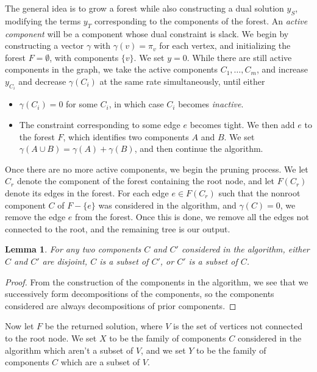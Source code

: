 \documentclass{article}
\theoremstyle{plain}
\newtheorem{lemma}{Lemma}
\theoremstyle{plain}
\begin{document}
The general idea is to grow a forest while also constructing a dual solution $y_S$, modifying the terms $y_T$ corresponding to the components of the forest. An {\it active component} will be a component whose dual constraint is slack. We begin by constructing a vector $\gamma$ with $\gamma(v) = \pi_v$ for each vertex, and initializing the forest $F = \emptyset$, with components $\{ v \}$. We set $y = 0$. While there are still active components in the graph, we take the active components $C_1, \dots, C_m$, and increase $y_{C_i}$ and decrease $\gamma(C_i)$ at the same rate simultaneously, until either
%
\begin{itemize}
    \item $\gamma(C_i) = 0$ for some $C_i$, in which case $C_i$ becomes {\it inactive}.
    \item The constraint corresponding to some edge $e$ becomes tight. We then add $e$ to the forest $F$, which identifies two components $A$ and $B$. We set $\gamma(A \cup B) = \gamma(A) + \gamma(B)$, and then continue the algorithm.
\end{itemize}
%
Once there are no more active components, we begin the pruning process. We let $C_r$ denote the component of the forest containing the root node, and let $F(C_r)$ denote its edges in the forest. For each edge $e \in F(C_r)$ such that the nonroot component $C$ of $F - \{ e \}$ was considered in the algorithm, and $\gamma(C) = 0$, we remove the edge $e$ from the forest. Once this is done, we remove all the edges not connected to the root, and the remaining tree is our output.

\begin{lemma}
    For any two components $C$ and $C'$ considered in the algorithm, either $C$ and $C'$ are disjoint, $C$ is a subset of $C'$, or $C'$ is a subset of $C$.
\end{lemma}
\begin{proof}
    From the construction of the components in the algorithm, we see that we successively form decompositions of the components, so the components considered are always decompositions of prior components.
\end{proof}

Now let $F$ be the returned solution, where $V$ is the set of vertices not connected to the root node. We set $X$ to be the family of components $C$ considered in the algorithm which aren't a subset of $V$, and we set $Y$ to be the family of components $C$ which are a subset of $V$.
\end{document}
